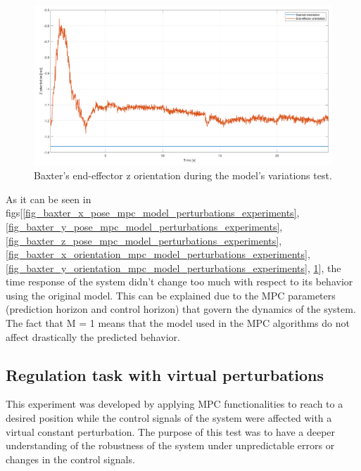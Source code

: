 \documentclass[11pt]{report} %
\begin{document}
\begin{figure}[H]
    \centering
    \includegraphics[width=1.0\linewidth]{assets/imgs/control_theory/mpc_regulation_model_changed/z_orientation.png}
    \caption{Baxter's end-effector z orientation during the model's variations test.} 
    \label{fig_baxter_z_orientation_mpc_model_perturbations_experiments}
\end{figure}

As it can be seen in figs[\ref{fig_baxter_x_pose_mpc_model_perturbations_experiments}, \ref{fig_baxter_y_pose_mpc_model_perturbations_experiments}, \ref{fig_baxter_z_pose_mpc_model_perturbations_experiments}, \ref{fig_baxter_x_orientation_mpc_model_perturbations_experiments}, \ref{fig_baxter_y_orientation_mpc_model_perturbations_experiments}, \ref{fig_baxter_z_orientation_mpc_model_perturbations_experiments}], the time response of the system didn't change too much with respect to its behavior using the original model. This can be explained due to the MPC parameters (prediction horizon and control horizon) that govern the dynamics of the system. The fact that M = 1 means that the model used in the MPC algorithms do not affect drastically the predicted behavior. 

\subsection{Regulation task with virtual perturbations}

This experiment was developed by applying MPC functionalities to reach to a desired position while the control signals of the system were affected with a virtual constant perturbation. The purpose of this test was to have a deeper understanding of the robustness of the system under unpredictable errors or changes in the control signals.\\
\end{document}
